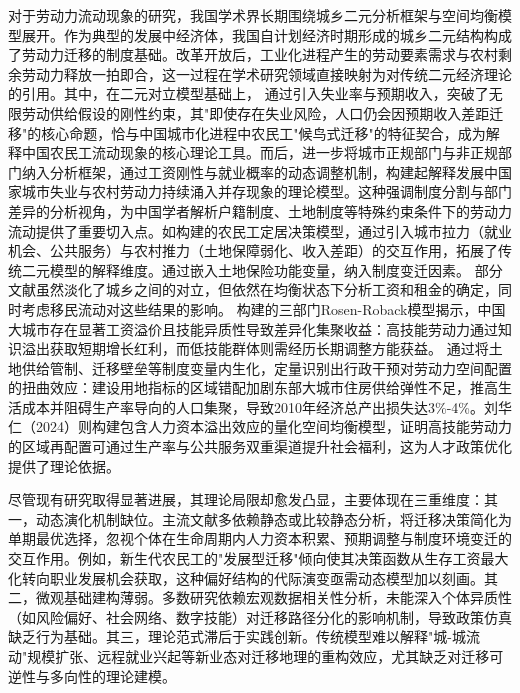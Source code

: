 \documentclass[a4paper,12pt]{article}
\begin{document}
对于劳动力流动现象的研究，我国学术界长期围绕城乡二元分析框架与空间均衡模型展开。作为典型的发展中经济体，我国自计划经济时期形成的城乡二元结构构成了劳动力迁移的制度基础。改革开放后，工业化进程产生的劳动要素需求与农村剩余劳动力释放一拍即合，这一过程在学术研究领域直接映射为对传统二元经济理论的引用。其中，在\cite{lewisEconomicDevelopmentUnlimited1954}二元对立模型基础上，
\cite{todaroModelLaborMigration1969}通过引入失业率与预期收入，突破了无限劳动供给假设的刚性约束，其"即使存在失业风险，人口仍会因预期收入差距迁移"的核心命题，恰与中国城市化进程中农民工"候鸟式迁移"的特征契合，成为解释中国农民工流动现象的核心理论工具。而后，\cite{harrisMigrationUnemploymentDevelopment1970}进一步将城市正规部门与非正规部门纳入分析框架，通过工资刚性与就业概率的动态调整机制，构建起解释发展中国家城市失业与农村劳动力持续涌入并存现象的理论模型。这种强调制度分割与部门差异的分析视角，为中国学者解析户籍制度、土地制度等特殊约束条件下的劳动力流动提供了重要切入点。如\cite{XiongCaiYunNongMinGongChengShiDingJuZhuanYiJueCeYinSuDeTuiLaMoXingJiShiZhengFenXi2007}构建的农民工定居决策模型，通过引入城市拉力（就业机会、公共服务）与农村推力（土地保障弱化、收入差距）的交互作用，拓展了传统二元模型的解释维度。\cite{HuangZhongHuaNongCunTuDiZhiDuAnPaiShiFouZuAiNongMinGongShiMinHuaTuoDaLuoMoXingTuoZhanHeYiWuShiShiZhengFenXi2014}通过嵌入土地保险功能变量，\cite{ZhongShuiYingXiangChengRenKouLiuDongDeLiLunJieShiNongCunRenKouTuiChuShiJiaoTuoDaLuoMoXingDeZaiXiuZheng2015}纳入制度变迁因素。
部分文献虽然淡化了城乡之间的对立，但依然在均衡状态下分析工资和租金的确定，同时考虑移民流动对这些结果的影响。
\cite{ZongJiaFengDaChengShiZhiFuLiaoGengGaoDeGongZiMa2015}构建的三部门Rosen-Roback模型揭示，中国大城市存在显著工资溢价且技能异质性导致差异化集聚收益：高技能劳动力通过知识溢出获取短期增长红利，而低技能群体则需经历长期调整方能获益。
\cite{WangLiLiWoGuoRenKouQianYiChengBenChengShiGuiMoYuShengChanLu2020,WangLiLiTuDiGongGeiFangJieYuLaoDongLiKongJianPeiZhiXiaoLu2023,WangLiLiLaoDongLiLiuDongDuiChengShiGongZiYuFuLiDeYingXiangJiYuKongJianJunHengMoXingDeFenXi2024}通过将土地供给管制、迁移壁垒等制度变量内生化，定量识别出行政干预对劳动力空间配置的扭曲效应：建设用地指标的区域错配加剧东部大城市住房供给弹性不足，推高生活成本并阻碍生产率导向的人口集聚，导致2010年经济总产出损失达3\%-4\%。刘华仁（2024）则构建包含人力资本溢出效应的量化空间均衡模型，证明高技能劳动力的区域再配置可通过生产率与公共服务双重渠道提升社会福利，这为人才政策优化提供了理论依据。

尽管现有研究取得显著进展，其理论局限却愈发凸显，主要体现在三重维度：其一，动态演化机制缺位。主流文献多依赖静态或比较静态分析，将迁移决策简化为单期最优选择，忽视个体在生命周期内人力资本积累、预期调整与制度环境变迁的交互作用。例如，新生代农民工的"发展型迁移"倾向使其决策函数从生存工资最大化转向职业发展机会获取，这种偏好结构的代际演变亟需动态模型加以刻画。其二，微观基础建构薄弱。多数研究依赖宏观数据相关性分析，未能深入个体异质性（如风险偏好、社会网络、数字技能）对迁移路径分化的影响机制，导致政策仿真缺乏行为基础。其三，理论范式滞后于实践创新。传统模型难以解释"城-城流动"规模扩张、远程就业兴起等新业态对迁移地理的重构效应，尤其缺乏对迁移可逆性与多向性的理论建模。
\end{document}
